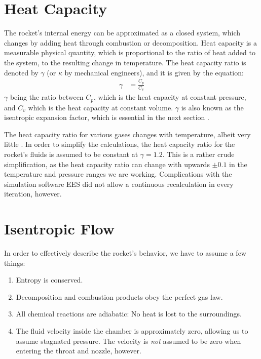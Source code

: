 \section{Heat Capacity}

	The rocket's internal energy can be approximated as a closed system, which changes by adding heat through combustion or decomposition. Heat capacity is a measurable physical quantity, which is proportional to the ratio of heat added to the system, to the resulting change in temperature. The heat capacity ratio is denoted by $\gamma$ (or $\kappa$ by mechanical engineers), and it is given by the equation:
	 \begin{align}
		 \gamma &= \frac{C_p}{C_v}
	 \end{align}
	$\gamma$ being the ratio between $C_p$, which is the heat capacity at constant pressure, and $C_v$ which is the heat capacity at constant volume. $\gamma$ is also known as the isentropic expansion factor, which is essential in the next section \cite{IntroFluidRobert}.

	The heat capacity ratio for various gases changes with temperature, albeit very little \cite{FluidFrank}. In order to simplify the calculations, the heat capacity ratio for the rocket's fluids is assumed to be constant at $\gamma = 1.2$. This is a rather crude simplification, as the heat capacity ratio can change with upwards $\pm 0.1$ in the temperature and pressure ranges we are working. Complications with the simulation software EES did not allow a continuous recalculation in every iteration, however.

\section{Isentropic Flow}

	In order to effectively describe the rocket's behavior, we have to assume a few things:
	\begin{enumerate}[topsep=0pt,itemsep=-1ex,partopsep=1ex,parsep=1ex]
		\item{Entropy is conserved.}
		\item{Decomposition and combustion products obey the perfect gas law.}
		\item{All chemical reactions are adiabatic: No heat is lost to the surroundings.}
		\item{The fluid velocity inside the chamber is approximately zero, allowing us to assume stagnated pressure. The velocity is \emph{not} assumed to be zero when entering the throat and nozzle, however.}
	\end{enumerate}


